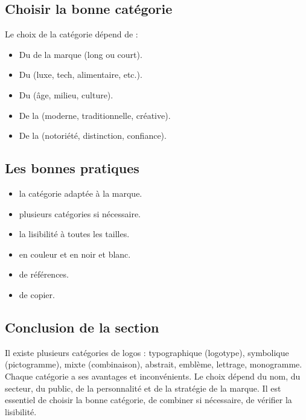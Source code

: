 \subsection{Choisir la bonne catégorie}

Le choix de la catégorie dépend de :

\begin{itemize}
    \item Du  de la marque (long ou court).
    \item Du  (luxe, tech, alimentaire, etc.).
    \item Du  (âge, milieu, culture).
    \item De la  (moderne, traditionnelle, créative).
    \item De la  (notoriété, distinction, confiance).
\end{itemize}

\subsection{Les bonnes pratiques}

\begin{itemize}
    \item {} la catégorie adaptée à la marque.
    \item {} plusieurs catégories si nécessaire.
    \item {} la lisibilité à toutes les tailles.
    \item {} en couleur et en noir et blanc.
    \item {} de références.
    \item {} de copier.
\end{itemize}

\subsection*{Conclusion de la section}

Il existe plusieurs catégories de logos : typographique (logotype), symbolique (pictogramme), mixte (combinaison), abstrait, emblème, lettrage, monogramme. Chaque catégorie a ses avantages et inconvénients. Le choix dépend du nom, du secteur, du public, de la personnalité et de la stratégie de la marque. Il est essentiel de choisir la bonne catégorie, de combiner si nécessaire, de vérifier la lisibilité.

